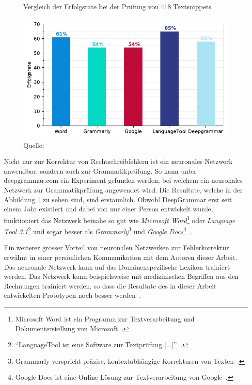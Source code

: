 \begin{figure}[h!] %
    \centering
    \captionsetup{width=.9\linewidth}
    \caption{Vergleich der Erfolgsrate bei der Prüfung von 418 Textsnippets}
    \label{deepgrammar}
    \includegraphics[scale=0.9]{graphics/matplot/grammar-tools.pdf}
    \caption*{Quelle: \textcite{Mugan}}
\end{figure} %
Nicht nur zur Korrektur von Rechtschreibfehlern ist ein neuronales Netzwerk anwendbar, sondern auch zur Grammatikprüfung. So kann unter deepgrammar.com ein Experiment gefunden werden, bei welchem ein neuronales Netzwerk zur Grammatikprüfung angewendet wird. Die Resultate, welche in der Abbildung \ref{deepgrammar} zu sehen sind, sind erstaunlich. Obwohl DeepGrammar erst seit einem Jahr existiert und dabei von nur einer Person entwickelt wurde, funktioniert das Netzwerk beinahe so gut wie \textit{Microsoft Word}\footnote{Microsoft Word ist ein Programm zur Textverarbeitung und Dokumenterstellung von Microsoft~\autocite{MicrosoftCorporation2018}.} oder \textit{Language Tool 3.1}\footnote{\enquote{LanguageTool ist eine Software zur Textprüfung [...]}~\autocite{LanguageTool2018}.} und sogar besser als \textit{Grammarly}\footnote{Grammarly verspricht präzise, kontextabhängige Korrekturen von Texten~\autocite{GrammarlyInc.2018}.} und \textit{Google Docs}\footnote{Google Docs ist eine Online-Lösung zur Textverarbeitung von Google~\autocite{GoogleLLC2018}.}~\autocite{Mugan}.


Ein weiterer grosser Vorteil von neuronalen Netzwerken zur Fehlerkorrektur erwähnt \textcite{Mugan2018} in einer persönlichen Kommunikation mit dem Autoren dieser Arbeit. Das neuronale Netzwerk kann auf das Domänenspezifische Lexikon trainiert werden. Das Netzwerk kann beispielsweise mit medizinischen Begriffen aus den Rechnungen trainiert werden, so dass die Resultate des in dieser Arbeit entwickelten Prototypen noch besser werden~\autocite{Mugan2018}.

